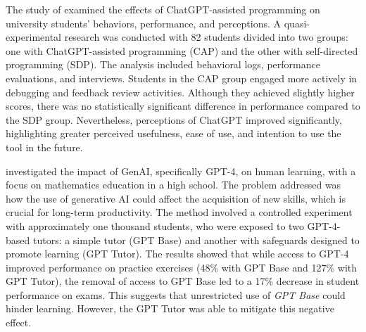 \documentclass[a4paper,twoside]{article}
\begin{document}

The study of \cite{Boudouaia24} examined the effects of ChatGPT-assisted
programming on university students' behaviors, performance, and perceptions.
A quasi-experimental research was conducted with 82 students divided into two
groups: one with ChatGPT-assisted programming (CAP) and the other with
self-directed programming (SDP). The analysis included behavioral logs,
performance evaluations, and interviews. Students in the CAP group engaged more
actively in debugging and feedback review activities. Although they achieved
slightly higher scores, there was no statistically significant difference in
performance compared to the SDP group. Nevertheless, perceptions of ChatGPT
improved significantly, highlighting greater perceived usefulness, ease of use,
and intention to use the tool in the future.


\cite{Bastani24} investigated the impact of GenAI, specifically GPT-4, on human
learning, with a focus on mathematics education in a high school. The problem
addressed was how the use of generative AI could affect the acquisition of new
skills, which is crucial for long-term productivity. The method involved a
controlled experiment with approximately one thousand students, who were exposed
to two GPT-4-based tutors: a simple tutor (GPT Base) and another with safeguards
designed to promote learning (GPT Tutor). The results showed that while access
to GPT-4 improved performance on practice exercises (48\% with GPT Base and
127\% with GPT Tutor), the removal of access to GPT Base led to a 17\% decrease
in student performance on exams. This suggests that unrestricted use of
\textit{GPT Base} could hinder learning. However, the GPT Tutor was able to
mitigate this negative effect.
\end{document}
